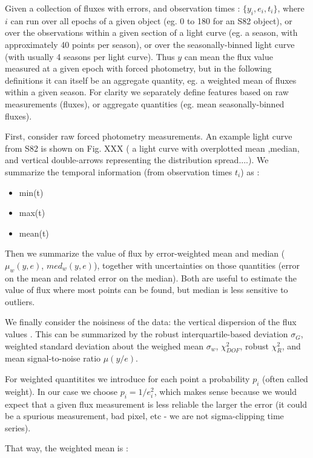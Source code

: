 \documentclass[fleqn,usenatbib]{mnras}  %
\begin{document}
Given a collection of fluxes with errors, and observation times : $\{ y_{i}, e_{i}, t_{i} \}$, where $i$ can run over all epochs of a given object (eg. 0 to 180 for an S82 object), or over the observations within a given section of a light curve (eg. a season, with approximately 40 points per season), or over the seasonally-binned light curve (with usually 4 seasons per light curve). 
Thus $y$ can mean the flux value measured at a given epoch with forced photometry, but in the following definitions it can itself be an aggregate quantity, eg. a weighted mean of fluxes within a given season.  For clarity we separately define features based on raw measurements (fluxes), or aggregate quantities (eg. mean seasonally-binned fluxes).  

First, consider raw forced photometry measurements.  An example light curve  from S82 is shown on Fig. XXX   ( a light curve with overplotted mean ,median,  and vertical double-arrows representing the distribution spread....).  We summarize the temporal information  (from observation times $t_{i}$) as : 
\begin{itemize}
	\item min(t)
	\item max(t)
	\item mean(t)
\end{itemize}

Then we summarize the value of flux by error-weighted mean and median ($\mu_{w}(y,e)$, $med_{w}(y,e)$), together with uncertainties on those quantities (error on the mean and related error on the median). Both are useful to estimate the value of flux where most points can be found, but median is less sensitive to outliers. 

We finally consider the noisiness of the data: the vertical dispersion of the flux values . This can be summarized by the robust interquartile-based deviation $\sigma_{G}$, weighted standard deviation about the weighed mean $\sigma_{w}$, $\chi^{2}_{DOF}$, robust $\chi^{2}_{R}$, and mean signal-to-noise ratio $\mu(y / e)$. 


For weighted quantitites we introduce for each point a probability $p_{i}$ (often called weight).  In our case we choose $p_{i} = 1 / e_{i}^{2}$, which makes sense because we would expect that a given flux measurement is less reliable the larger the error (it could be a spurious measurement, bad pixel, etc - we are not sigma-clipping time series). 

That way, the weighted mean is  :
\end{document}
